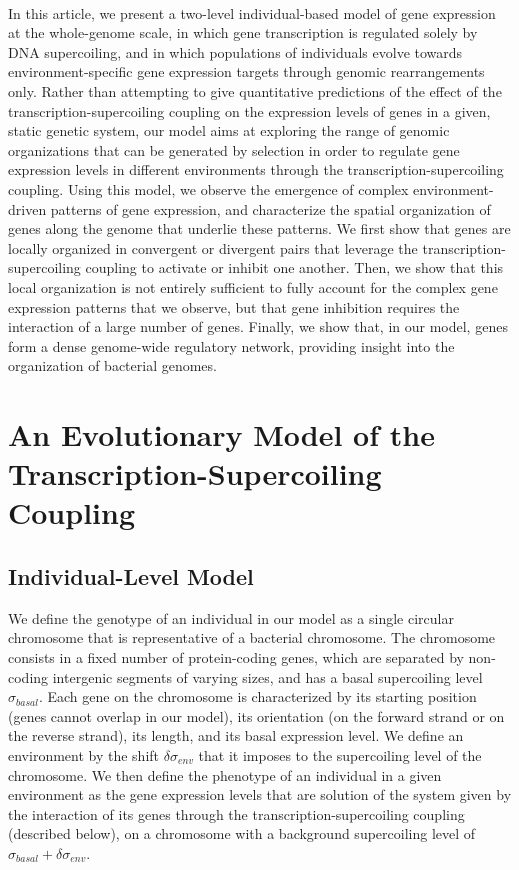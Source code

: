 \paragraph{}
In this article, we present a two-level individual-based model of gene expression at the whole-genome scale, in which gene transcription is regulated solely by DNA supercoiling, and in which populations of individuals evolve towards environment-specific gene expression targets through genomic rearrangements only.
Rather than attempting to give quantitative predictions of the  effect of the transcription-supercoiling coupling on the expression levels of genes in a given, static genetic system, our model aims at exploring the range of genomic organizations that can be generated by selection in order to regulate gene expression levels in different environments through the transcription-supercoiling coupling.
Using this model, we observe the emergence of complex environment-driven patterns of gene expression, and characterize the spatial organization of genes along the genome that underlie these patterns.
We first show that genes are locally organized in convergent or divergent pairs that leverage the transcription-supercoiling coupling to activate or inhibit one another.
Then, we show that this local organization is not entirely sufficient to fully account for the complex gene expression patterns that we observe, but that gene inhibition requires the interaction of a large number of genes.
Finally, we show that, in our model, genes form a dense genome-wide regulatory network, providing insight into the organization of bacterial genomes.


\section{An Evolutionary Model of the Transcription-Supercoiling Coupling}
\label{sec:ploscb:model}

\subsection{Individual-Level Model}
\label{sec:ploscb:indiv_model}

We define the genotype of an individual in our model as a single circular chromosome that is representative of a bacterial chromosome.
The chromosome consists in a fixed number of protein-coding genes, which are separated by non-coding intergenic segments of varying sizes, and has a basal supercoiling level $\sigma_{basal}$.
Each gene on the chromosome is characterized by its starting position (genes cannot overlap in our model), its orientation (on the forward strand or on the reverse strand), its length, and its basal expression level.
We define an environment by the shift $\delta\sigma_{env}$ that it imposes to the supercoiling level of the chromosome.
We then define the phenotype of an individual in a given environment as the gene expression levels that are solution of the system given by the interaction of its genes through the transcription-supercoiling coupling (described below), on a chromosome with a background supercoiling level of $\sigma_{basal} + \delta\sigma_{env}$.

